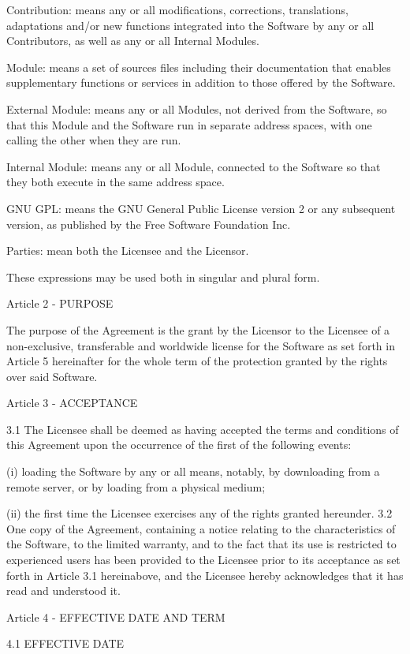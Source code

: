 \documentclass[oneside,english,onecolumn,letterpaper]{book}
\begin{document}
Contribution: means any or all modifications, corrections, translations, adaptations and/or new functions integrated into the Software by any or all Contributors, as well as any or all Internal Modules.

Module: means a set of sources files including their documentation that enables supplementary functions or services in addition to those offered by the Software.

External Module: means any or all Modules, not derived from the Software, so that this Module and the Software run in separate address spaces, with one calling the other when they are run.

Internal Module: means any or all Module, connected to the Software so that they both execute in the same address space.

GNU GPL: means the GNU General Public License version 2 or any subsequent version, as published by the Free Software Foundation Inc.

Parties: mean both the Licensee and the Licensor.

These expressions may be used both in singular and plural form.

Article 2 - PURPOSE

The purpose of the Agreement is the grant by the Licensor to the Licensee of a non-exclusive, transferable and worldwide license for the Software as set forth in Article 5 hereinafter for the whole term of the protection granted by the rights over said Software.

Article 3 - ACCEPTANCE

3.1 The Licensee shall be deemed as having accepted the terms and conditions of this Agreement upon the occurrence of the first of the following events:

(i) loading the Software by any or all means, notably, by downloading from a remote server, or by loading from a physical medium;

(ii) the first time the Licensee exercises any of the rights granted hereunder.
3.2 One copy of the Agreement, containing a notice relating to the characteristics of the Software, to the limited warranty, and to the fact that its use is restricted to experienced users has been provided to the Licensee prior to its acceptance as set forth in Article 3.1 hereinabove, and the Licensee hereby acknowledges that it has read and understood it.

Article 4 - EFFECTIVE DATE AND TERM

4.1 EFFECTIVE DATE
\end{document}
